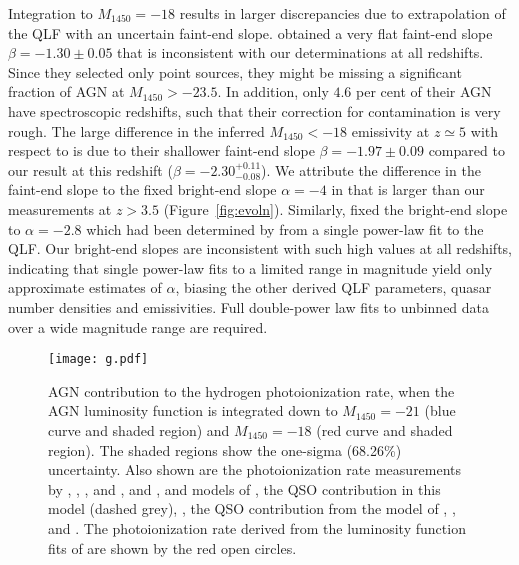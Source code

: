 \documentclass[fleqn,usenatbib]{mnras}
\begin{document}
Integration to $M_{1450}=-18$ results in larger discrepancies due to
extrapolation of the QLF with an uncertain faint-end slope.
\citet{2018PASJ...70S..34A} obtained a very flat faint-end slope
$\beta=-1.30\pm 0.05$ that is inconsistent with our determinations at
all redshifts. Since they selected only point sources, they might be
missing a significant fraction of AGN at $M_{1450}>-23.5$.  In
addition, only $4.6$ per cent of their AGN have spectroscopic
redshifts, such that their correction for contamination is very rough.
The large difference in the inferred $M_{1450}<-18$ emissivity at
$z\simeq 5$ with respect to \citet{2018AJ....155..131M} is due to
their shallower faint-end slope $\beta=-1.97\pm 0.09$ compared to our
result at this redshift ($\beta=-2.30^{+0.11}_{-0.08}$). We attribute
the difference in the faint-end slope to the fixed bright-end slope
$\alpha=-4$ in \citet{2018AJ....155..131M} that is larger than our
measurements at $z>3.5$ (Figure~\ref{fig:evoln}).  Similarly,
\citet{2017ApJ...847L..15O} fixed the bright-end slope to
$\alpha=-2.8$ which had been determined by \citet{2016ApJ...833..222J}
from a single power-law fit to the QLF.  Our
bright-end slopes are inconsistent with such high values at all
redshifts, indicating that single power-law fits to a limited range in
magnitude yield only approximate estimates of $\alpha$, biasing the
other derived QLF parameters, quasar number densities and
emissivities.  Full double-power law fits to unbinned data over a wide
magnitude range are required.

\begin{figure*}
  \begin{center}
    \texttt{[image: g.pdf]}
  \end{center}
  \caption{AGN contribution to the hydrogen photoionization rate, when
    the AGN luminosity function is integrated down to $M_{1450}=-21$
    (blue curve and shaded region) and $M_{1450}=-18$ (red curve and
    shaded region).  The shaded regions show the one-sigma (68.26\%)
    uncertainty.  Also shown are the photoionization rate measurements
    by \citet[filled circles]{2013MNRAS.436.1023B}, \citet[inverted
      triangles]{2011MNRAS.412.2543C},
    \citet[triangles]{2011MNRAS.412.1926W}, \citet[blue
      hexagons]{2018MNRAS.473..560D} and \citet[green
      squares]{2018ApJ...855..106D}, and
    \citet[pentagons]{2017MNRAS.467.3172G}, and models of
    \citet[dotted brown curve]{2012ApJ...746..125H}, the QSO
    contribution in this model (dashed grey), \citet[dashed
      brown]{2015ApJ...813L...8M}, the QSO contribution from the model
    of \citet[dashed orange]{2015MNRAS.451L..30K}, \citet[dotted
      grey]{2017ApJ...837..106O}, and \citet[dashed
      grey]{2018arXiv180104931P}.  The photoionization rate derived
    from the luminosity function fits of \citet{2015AA...578A..83G}
    are shown by the red open circles.}
  \label{fig:gammapi}
\end{figure*}
\end{document}
